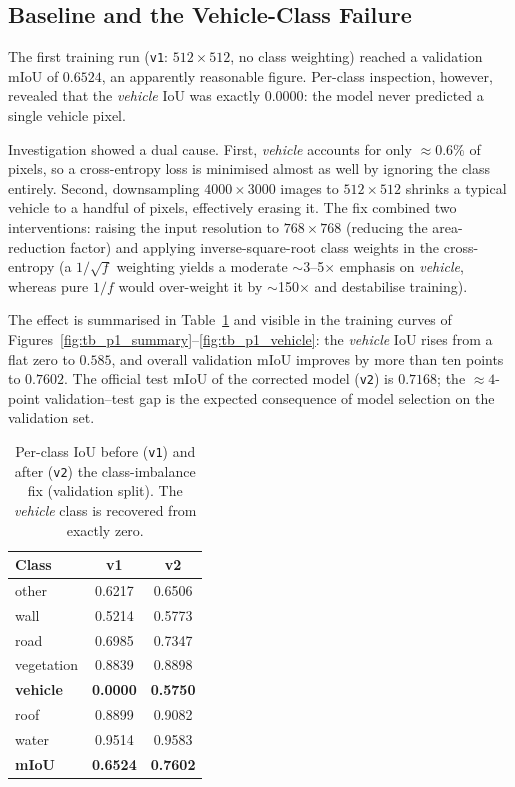 \documentclass[11pt,a4paper]{article}
\begin{document}
\subsection{Baseline and the Vehicle-Class Failure}
\label{sec:vehicle}
The first training run (\texttt{v1}: $512\times512$, no class weighting)
reached a validation mIoU of $0.6524$, an apparently reasonable figure.
Per-class inspection, however, revealed that the \emph{vehicle} IoU was
exactly $0.0000$: the model never predicted a single vehicle pixel.

Investigation showed a dual cause. First, \emph{vehicle} accounts for only
$\approx 0.6\%$ of pixels, so a cross-entropy loss is minimised almost as well
by ignoring the class entirely. Second, downsampling $4000\times3000$ images to
$512\times512$ shrinks a typical vehicle to a handful of pixels, effectively
erasing it. The fix combined two interventions: raising the input resolution to
$768\times768$ (reducing the area-reduction factor) and applying
inverse-square-root class weights in the cross-entropy (a $1/\sqrt{f}$ weighting
yields a moderate $\sim$3--5$\times$ emphasis on \emph{vehicle}, whereas pure
$1/f$ would over-weight it by $\sim$150$\times$ and destabilise training).

The effect is summarised in Table~\ref{tab:v1v2} and visible in the training
curves of Figures~\ref{fig:tb_p1_summary}--\ref{fig:tb_p1_vehicle}: the
\emph{vehicle} IoU rises from a flat zero to $0.585$, and overall validation
mIoU improves by more than ten points to $0.7602$. The official test mIoU of
the corrected model (\texttt{v2}) is $0.7168$; the $\approx 4$-point
validation--test gap is the expected consequence of model selection on the
validation set.

\begin{table}[ht]
\centering
\caption{Per-class IoU before (\texttt{v1}) and after (\texttt{v2}) the
class-imbalance fix (validation split). The \emph{vehicle} class is recovered
from exactly zero.}
\label{tab:v1v2}
\begin{tabular}{lcc}
\toprule
\textbf{Class} & \textbf{v1} & \textbf{v2} \\
\midrule
other        & 0.6217 & 0.6506 \\
wall         & 0.5214 & 0.5773 \\
road         & 0.6985 & 0.7347 \\
vegetation   & 0.8839 & 0.8898 \\
\textbf{vehicle} & \textbf{0.0000} & \textbf{0.5750} \\
roof         & 0.8899 & 0.9082 \\
water        & 0.9514 & 0.9583 \\
\midrule
\textbf{mIoU} & \textbf{0.6524} & \textbf{0.7602} \\
\bottomrule
\end{tabular}
\end{table}
\end{document}
